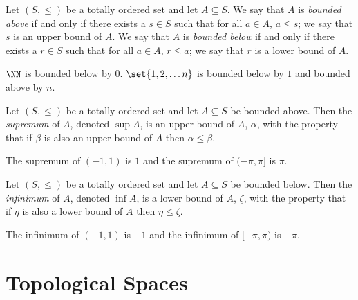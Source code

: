 \begin{definition*}
	Let $(S,\leq)$ be a totally ordered set and let $A\subseteq S$.
	We say that $A$ is \textit{bounded above} if and only if there exists a $s\in S$ such that for all $a\in A$, $a\leq s$; we say that $s$ is an upper bound of $A$.
	We say that $A$ is \textit{bounded below} if and only if there exists a $r\in S$ such that for all $a\in A$, $r\leq a$; we say that $r$ is a lower bound of $A$.
\end{definition*}
\begin{example*}
	$\NN$ is bounded below by $0$.
	$\set{1,2,\ldots n}$ is bounded below by $1$ and bounded above by $n$.
\end{example*}

\begin{definition*}
	Let $(S,\leq)$ be a totally ordered set and let $A\subseteq S$ be bounded above.
	Then the \textit{supremum} of $A$, denoted $\sup A$, is an upper bound of $A$, $\alpha$, with the property that if $\beta$ is also an upper bound of $A$ then $\alpha\leq\beta$.
\end{definition*}
\begin{example*}
	The supremum of $(-1,1)$ is $1$ and the supremum of $(-\pi, \pi]$ is $\pi$.
\end{example*}

\begin{definition*}
	Let $(S,\leq)$ be a totally ordered set and let $A\subseteq S$ be bounded below.
	Then the \textit{infinimum} of $A$, denoted $\inf A$, is a lower bound of $A$, $\zeta$, with the property that if $\eta$ is also a lower bound of $A$ then $\eta\leq\zeta$.
\end{definition*}
\begin{example*}
	The infinimum of $(-1,1)$ is $-1$ and the infinimum of $[-\pi, \pi)$ is $-\pi$.
\end{example*}


\pagebreak


\section*{Topological Spaces}


